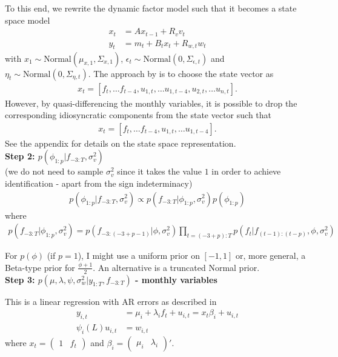 To this end, we rewrite the dynamic factor model such that it becomes a state space model
\begin{align}
\label{eqn:ssm_obs}
x_t &= A x_{t-1} + R_v v_t \\
y_t &= m_t + B_t x_t + R_{w,t} w_t
\end{align}
with $x_1\sim \mathrm{Normal}(\mu_{x,1}, \Sigma_{x,1})$, $\epsilon_t\sim \mathrm{Normal}(0, \Sigma_{\epsilon,t})$ and $\eta_t\sim \mathrm{Normal}(0, \Sigma_{\eta,t})$. The approach by \citet{MarcellinoEtal2016} is to choose the state vector as 
\begin{align}
x_t = [f_t, \dots f_{t-4}, u_{1,t}, \dots u_{1, t-4}, u_{2,t}, \dots u_{n,t}].
\end{align}
However, by quasi-differencing the monthly variables, it is possible to drop the corresponding idiosyncratic components from the state vector such that 
\begin{align}
x_t = [f_t, \dots f_{t-4}, u_{1,t}, \dots u_{1, t-4}]. 
\end{align}
See the appendix for details on the state space representation. \\

\textbf{Step 2: $p(\phi_{1:p}|f_{-3:T}, \sigma_{v}^2)$}\\
(we do not need to sample $\sigma_v^2$ since it takes the value $1$ in order to achieve identification - apart from the sign indeterminacy)
\begin{align*}
p(\phi_{1:p}|f_{-3:T}, \sigma_v^2) \propto p(f_{-3:T}|\phi_{1:p}, \sigma_v^2) p(\phi_{1:p})
\end{align*}
where
\begin{align*}
p(f_{-3:T}|\phi_{1:p}, \sigma_{v}^2) = p(f_{-3:(-3+p-1)}|\phi, \sigma_{v}^2)\prod_{t=(-3+p):T} p(f_t|f_{(t-1):(t-p)}, \phi, \sigma_{v}^2)
\end{align*}

For $p(\phi)$ (if $p=1$), I might use a uniform prior on $[-1,1]$ or, more general, a Beta-type prior for $\frac{\phi+1}{2}$. An alternative is a truncated Normal prior.\\

\textbf{Step 3: $p(\mu, \lambda, \psi, \sigma_{w}^2|y_{1:T}, f_{-3:T})$ - monthly variables}

This is a linear regression with AR errors as described in \citet[section 4.1]{ChibGreenberg1994}
\begin{align}
y_{i,t} &= \mu_i + \lambda_i f_t + u_{i,t} = x_t\beta_i + u_{i,t} \\
\psi_i(L)u_{i,t} &= w_{i,t}
\end{align}
where $x_t = \begin{pmatrix} 1 & f_t \end{pmatrix}$ and $\beta_i = \begin{pmatrix} \mu_i & \lambda_i \end{pmatrix}'$.\\

